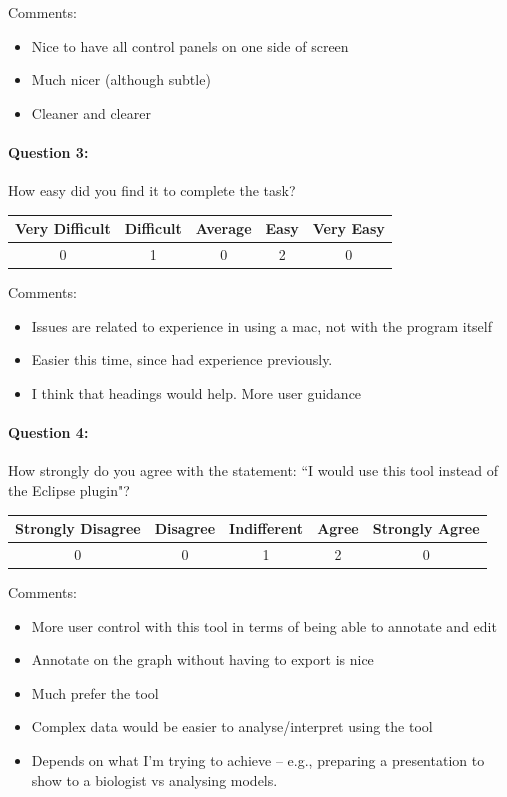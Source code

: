 Comments:
\begin{itemize}
\item Nice to have all control panels on one side of screen
\item Much nicer (although subtle)
\item Cleaner and clearer
\end{itemize}

\paragraph*{Question 3: } How easy did you find it to complete the task?

\begin{center}
\begin{tabular}{ | c | c | c | c | c |}
    \hline
    Very Difficult & Difficult & Average & Easy & Very Easy \\
    \hline
    0 & 1 & 0 & 2 & 0 \\
    \hline
\end{tabular}
\end{center}

Comments:
\begin{itemize}
\item Issues are related to experience in using a mac, not with the program itself
\item Easier this time, since had experience previously.
\item I think that headings would help.  More user guidance
\end{itemize}

\paragraph*{Question 4: } How strongly do you agree with the statement: ``I would use this tool instead of the Eclipse plugin"?

\begin{center}
\begin{tabular}{ | c | c | c | c | c |}
    \hline
    Strongly Disagree & Disagree  & Indifferent & Agree & Strongly Agree \\
    \hline
    0 & 0 & 1 & 2 & 0 \\
    \hline
\end{tabular}
\end{center}

Comments:
\begin{itemize}
\item More user control with this tool in terms of being able to annotate and edit
\item Annotate on the graph without having to export is nice
\item Much prefer the tool
\item Complex data would be easier to analyse/interpret using the tool
\item Depends on what I'm trying to achieve -- e.g., preparing a presentation to show to a biologist vs analysing models.
\end{itemize}

